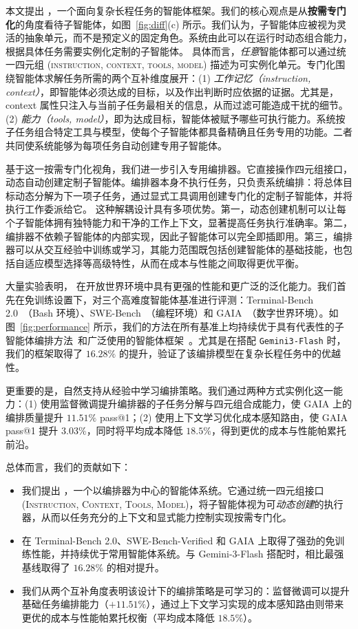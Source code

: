 本文提出 \our{}，一个面向复杂长程任务的智能体框架。我们的核心观点是从\textbf{按需专门化}的角度看待子智能体，如图~\ref{fig:diff}(c) 所示。我们认为，子智能体应被视为灵活的抽象单元，而不是预定义的固定角色。系统由此可以在运行时动态组合能力，根据具体任务需要实例化定制的子智能体。
具体而言，\emph{任意}智能体都可以通过统一四元组 \textsc{(instruction, context, tools, model)} 描述为可实例化单元。专门化围绕智能体求解任务所需的两个互补维度展开：(1) \emph{工作记忆（instruction, context）}，即智能体必须达成的目标，以及作出判断时应依据的证据。尤其是，context 属性只注入与当前子任务最相关的信息，从而过滤可能造成干扰的细节。(2) \emph{能力（tools, model）}，即为达成目标，智能体被赋予哪些可执行能力。系统按子任务组合特定工具与模型，使每个子智能体都具备精确且任务专用的功能。二者共同使系统能够为每项任务自动创建专用子智能体。

基于这一按需专门化视角，我们进一步引入专用编排器。它直接操作四元组接口，动态自动创建定制子智能体。编排器本身不执行任务，只负责系统编排：将总体目标动态分解为下一项子任务，通过显式工具调用创建专门化的定制子智能体，并将执行工作委派给它。
这种解耦设计具有多项优势。第一，动态创建机制可以让每个子智能体拥有独特能力和干净的工作上下文，显著提高任务执行准确率。第二，编排器不依赖子智能体的内部实现，因此子智能体可以完全即插即用。第三，编排器可以从交互经验中训练或学习，其能力范围既包括创建智能体的基础技能，也包括自适应模型选择等高级特性，从而在成本与性能之间取得更优平衡。

大量实验表明，\our{} 在开放世界环境中具有更强的性能和更广泛的泛化能力。我们首先在免训练设置下，对三个高难度智能体基准进行评测：Terminal-Bench 2.0~\cite{tbench_2025}（Bash 环境）、SWE-Bench~\cite{jimenez2023swe}（编程环境）和 GAIA~\cite{mialon2023gaia}（数字世界环境）。如图~\ref{fig:performance} 所示，我们的方法在所有基准上均持续优于具有代表性的子智能体编排方法~\cite{anthropic_claude_code_subagents}和广泛使用的智能体框架~\cite{wang2024openhands, yang2024sweagent}。尤其是在搭配 \texttt{Gemini3-Flash} 时，我们的框架取得了 $16.28\%$ 的提升，验证了该编排模型在复杂长程任务中的优越性。

更重要的是，\our 自然支持从经验中学习编排策略。我们通过两种方式实例化这一能力：(1) 使用监督微调提升编排器的子任务分解与四元组合成能力，使 GAIA 上的编排质量提升 $11.51\%$ pass@1；(2) 使用上下文学习优化成本感知路由，使 GAIA pass@1 提升 $3.03\%$，同时将平均成本降低 $18.5\%$，得到更优的成本与性能帕累托前沿。

总体而言，我们的贡献如下：
\begin{itemize}
    \item 我们提出 \our，一个以编排器为中心的智能体系统。它通过统一四元组接口 \textsc{(Instruction, Context, Tools, Model)}，将子智能体视为可\emph{动态创建}的执行器，从而以任务充分的上下文和显式能力控制实现按需专门化。
    \item \our 在 Terminal-Bench 2.0、SWE-Bench-Verified 和 GAIA 上取得了强劲的免训练性能，并持续优于常用智能体系统。与 Gemini-3-Flash 搭配时，相比最强基线取得了 $16.28\%$ 的相对提升。
    \item 我们从两个互补角度表明该设计下的编排策略是可学习的：监督微调可以提升基础任务编排能力（$+11.51\%$），通过上下文学习实现的成本感知路由则带来更优的成本与性能帕累托权衡（平均成本降低 $18.5\%$）。
\end{itemize}

